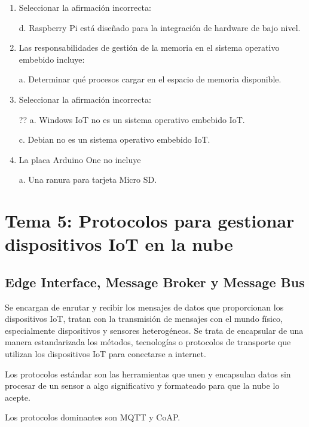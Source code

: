 \documentclass[12pt, twoside, openright]{report} %
\begin{document}
\begin{enumerate}
	\item Seleccionar la afirmación incorrecta:

	      d. Raspberry Pi está diseñado para la integración de hardware de bajo nivel.

	\item Las responsabilidades de gestión de la memoria en el sistema operativo embebido incluye:

	      a. Determinar qué procesos cargar en el espacio de memoria disponible.

	\item Seleccionar la afirmación incorrecta:

	      ?? a. Windows IoT no es un sistema operativo embebido IoT.

	      c. Debian no es un sistema operativo embebido IoT.

	\item La placa Arduino One no incluye

	      a. Una ranura para tarjeta Micro SD.
\end{enumerate}


\chapter{Tema 5: Protocolos para gestionar dispositivos IoT en la nube}

\section{Edge Interface, Message Broker y Message Bus}

Se encargan de enrutar y recibir los mensajes de datos que proporcionan los dispositivos IoT, tratan con la transmisión de mensajes con el mundo físico, especialmente dispositivos y sensores heterogéneos. Se trata de encapsular de una manera estandarizada los métodos, tecnologías o protocolos de transporte que utilizan los dispositivos IoT para conectarse a internet.

Los protocolos estándar son las herramientas que unen y encapsulan datos sin procesar de un sensor a algo significativo y formateado para que la nube lo acepte.

Los protocolos dominantes son MQTT y CoAP.
\end{document}
